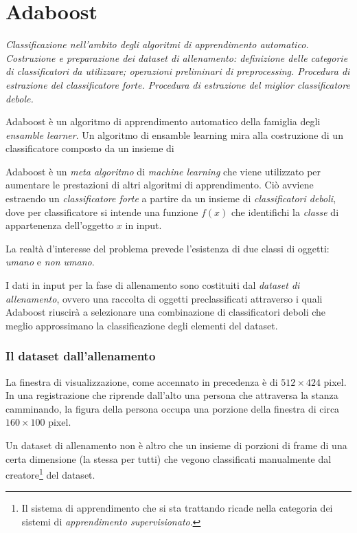 
\chapter{Adaboost}
\label{cap:adaboost}
\emph{Classificazione nell'ambito degli algoritmi di apprendimento automatico.
Costruzione e preparazione dei dataset di allenamento:
    definizione delle categorie di classificatori da utilizzare;
    operazioni preliminari di preprocessing.
Procedura di estrazione del classificatore forte.
Procedura di estrazione del miglior classificatore debole.}


Adaboost è un algoritmo di apprendimento automatico della famiglia degli \emph{ensamble learner}. Un algoritmo di ensamble learning mira alla costruzione di un classificatore composto da un insieme di


Adaboost è un \emph{meta algoritmo} di \emph{machine learning} che viene utilizzato per aumentare le prestazioni di altri algoritmi di apprendimento. Ciò avviene estraendo un \emph{classificatore forte} a partire da un insieme di \emph{classificatori deboli}, dove per classificatore si intende una funzione $f(x)$ che identifichi la \emph{classe} di appartenenza dell'oggetto $x$ in input.

La realtà d'interesse del problema prevede l'esistenza di due classi di oggetti: \emph{umano} e \emph{non umano}.

I dati in input per la fase di allenamento sono costituiti dal \emph{dataset di allenamento}, ovvero una raccolta di oggetti preclassificati attraverso i quali Adaboost riuscirà a selezionare una combinazione di classificatori deboli che meglio approssimano la classificazione degli elementi del dataset.

\subsection{Il dataset dall'allenamento} %
\label{sub:il_dataset_dall_allenamento}
La finestra di visualizzazione, come accennato in precedenza è di $512 \times 424$ pixel. In una registrazione che riprende dall'alto una persona che attraversa la stanza camminando, la figura della persona occupa una porzione della finestra di circa $160 \times 100$ pixel.

Un dataset di allenamento non è altro che un insieme di porzioni di frame di una certa dimensione (la stessa per tutti) che vegono classificati manualmente dal creatore\footnote{Il sistema di apprendimento che si sta trattando ricade nella categoria dei sistemi di \emph{apprendimento supervisionato}.} del dataset.

